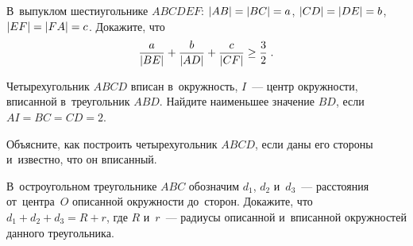 \begin{problems}
\item
В~выпуклом шестиугольнике $ABCDEF$:
$\lvert AB \rvert = \lvert BC \rvert = a$, $\lvert CD \rvert = \lvert DE \rvert = b$,
$\lvert EF \rvert = \lvert FA \rvert = c$.
Докажите, что
\[
    \frac{a}{\lvert BE \rvert} + \frac{b}{\lvert AD \rvert} + \frac{c}{\lvert CF \rvert}
\geq
    \frac{3}{2}
\; . \]

\item
Четырехугольник $ABCD$ вписан в~окружность, $I$~--- центр окружности, вписанной
в~треугольник $ABD$.
Найдите наименьшее значение $BD$, если $AI = BC = CD = 2$.

\item
Объясните, как построить четырехугольник $ABCD$, если даны его стороны
и~известно, что он вписанный.

\item
В~остроугольном треугольнике $ABC$ обозначим $d_1$, $d_2$ и~$d_3$~---
расстояния от~центра~$O$ описанной окружности до~сторон.
Докажите, что $d_1 + d_2 + d_3 = R + r$, где $R$ и~$r$~--- радиусы описанной
и~вписанной окружностей данного треугольника.

\end{problems}

\endgroup %

